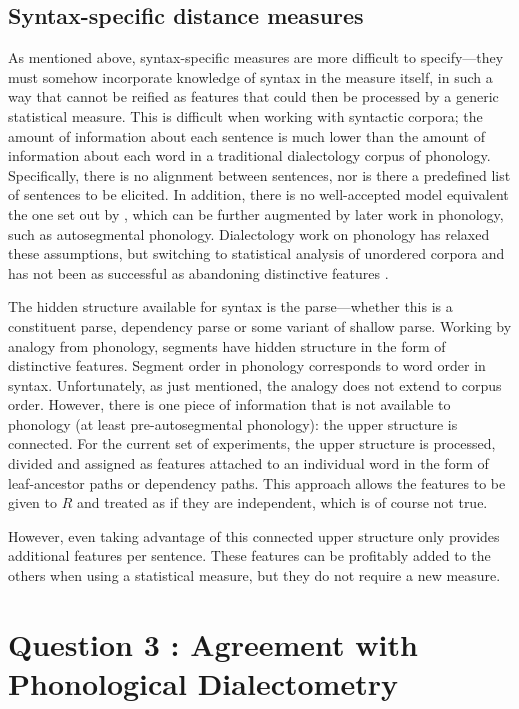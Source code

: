 \subsection{Syntax-specific distance measures}

As mentioned above, syntax-specific measures are more difficult to
specify---they must somehow incorporate knowledge of syntax in the
measure itself, in such a way that cannot be reified as features that
could then be processed by a generic statistical measure. This is
difficult when working with syntactic corpora; the amount of
information about each sentence is much lower than the amount of
information about each word in a traditional dialectology corpus of
phonology. Specifically, there is no alignment between sentences, nor is
there a predefined list of sentences to be elicited. In addition,
there is no well-accepted model equivalent the one set out by
, which can be further augmented by later work in
phonology, such as  autosegmental
phonology. Dialectology work on phonology has relaxed these
assumptions, but switching to statistical analysis of unordered
corpora \cite{sanders06} and \cite{hinrichs07} has not
been as successful as abandoning distinctive features \cite{heeringa04}.

The hidden structure available for syntax is the parse---whether this
is a constituent parse, dependency parse or some variant of shallow
parse. Working by analogy from phonology, segments have hidden
structure in the form of distinctive features. Segment order in
phonology corresponds to word order in syntax. Unfortunately, as just
mentioned, the analogy does not extend to corpus order. However, there
is one piece of information that is not available to phonology (at
least pre-autosegmental phonology): the upper structure is
connected. For the current set of experiments, the upper structure is
processed, divided and assigned as features attached to an individual
word in the form of leaf-ancestor paths or dependency paths. This
approach allows the features to be given to $R$ and treated as if they
are independent, which is of course not true.

However, even taking advantage of this connected upper structure only
provides additional features per sentence. These features can be
profitably added to the others when using a statistical measure, but
they do not require a new measure.


\section{Question 3 : Agreement with Phonological Dialectometry}

